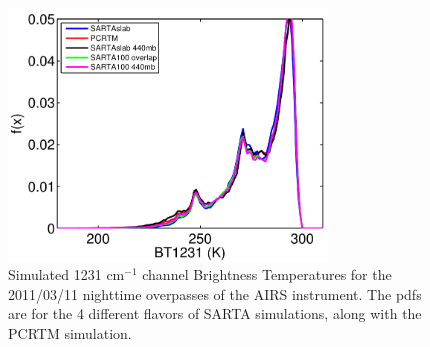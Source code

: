 \documentclass[agupp]{aguplus}              %
\newcommand{\wn}{cm$^{-1}$\xspace}
\begin{document}
\begin{article}
\begin{figure}[h]
\noindent\includegraphics[width=20pc]{FIGS/ecm_cloudBT1231_gev_ocean_SvsP}
\caption{Simulated 1231 \wn channel Brightness Temperatures for the 2011/03/11 nighttime
overpasses of the AIRS instrument. The pdfs are for the 4 different flavors of SARTA
simulations, along with the PCRTM simulation.}
\label{SvsPalloceanPDF} 
\end{figure}


\end{article}
\end{document}
